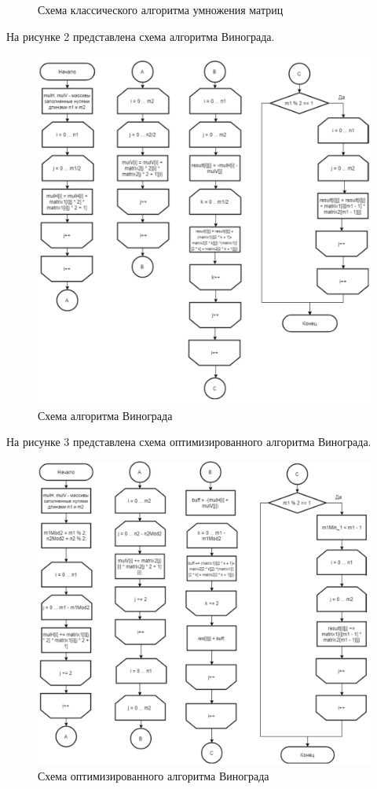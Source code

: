 \documentclass[a4paper, 12pt]{article}
\begin{document}
\begin{flushleft}
\begin{figure}[h!]
		\centering \caption{Схема классического алгоритма умножения матриц}
	\end{figure}
	\clearpage
	\newpage
	\hspace*{5mm} На рисунке 2 представлена схема алгоритма Винограда.
	\begin{figure}[h!]
		\centering \includegraphics[scale=1.3]{vinograd}
		\centering \caption{Схема алгоритма Винограда}
	\end{figure}
    \clearpage
	\newpage
	\hspace*{5mm} На рисунке 3 представлена схема оптимизированного алгоритма Винограда.
	\begin{figure}[h!]
		\centering \includegraphics[scale=1.3]{optimizedvinograd}
		\centering \caption{Схема оптимизированного алгоритма Винограда}
	\end{figure}
	\clearpage
	\newpage

\end{flushleft}
\end{document}
